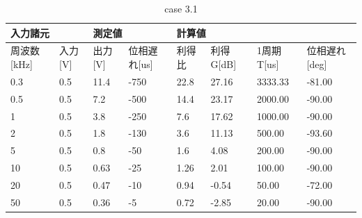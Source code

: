 \documentclass[dvipdfmx,titlepage,a4j]{jsarticle}  %
\begin{document}
\begin{table}[H]
  \centering
  \caption{case 3.1}
  \begin{tabular}{ll|ll|llll}
  \hline
  \multicolumn{2}{l|}{入力諸元}                        & \multicolumn{2}{l|}{測定値}                           & \multicolumn{4}{l}{計算値}                                                                                                                          \\ \hline
  \multicolumn{1}{l|}{周波数{[}kHz{]}} & 入力{[}V{]} & \multicolumn{1}{l|}{出力{[}V{]}} & 位相遅れ{[}us{]} & \multicolumn{1}{l|}{利得比} & \multicolumn{1}{l|}{利得G{[}dB{]}} & \multicolumn{1}{l|}{1周期T{[}us{]}} & \multicolumn{1}{l}{位相遅れ{[}deg{]}} \\ \hline \hline
  \multicolumn{1}{l|}{0.3}           & 0.5         & \multicolumn{1}{l|}{11.4}        & -750            & \multicolumn{1}{l|}{22.8}    & \multicolumn{1}{l|}{27.16}           & \multicolumn{1}{l|}{3333.33}         & -81.00                              \\ \hline
  \multicolumn{1}{l|}{0.5}           & 0.5         & \multicolumn{1}{l|}{7.2}         & -500            & \multicolumn{1}{l|}{14.4}    & \multicolumn{1}{l|}{23.17}           & \multicolumn{1}{l|}{2000.00}         & -90.00                              \\ \hline
  \multicolumn{1}{l|}{1}             & 0.5         & \multicolumn{1}{l|}{3.8}         & -250            & \multicolumn{1}{l|}{7.6}     & \multicolumn{1}{l|}{17.62}           & \multicolumn{1}{l|}{1000.00}         & -90.00                              \\ \hline
  \multicolumn{1}{l|}{2}             & 0.5         & \multicolumn{1}{l|}{1.8}         & -130            & \multicolumn{1}{l|}{3.6}     & \multicolumn{1}{l|}{11.13}           & \multicolumn{1}{l|}{500.00}          & -93.60                              \\ \hline
  \multicolumn{1}{l|}{5}             & 0.5         & \multicolumn{1}{l|}{0.8}         & -50             & \multicolumn{1}{l|}{1.6}     & \multicolumn{1}{l|}{4.08}            & \multicolumn{1}{l|}{200.00}          & -90.00                              \\ \hline
  \multicolumn{1}{l|}{10}            & 0.5         & \multicolumn{1}{l|}{0.63}        & -25             & \multicolumn{1}{l|}{1.26}    & \multicolumn{1}{l|}{2.01}            & \multicolumn{1}{l|}{100.00}          & -90.00                              \\ \hline
  \multicolumn{1}{l|}{20}            & 0.5         & \multicolumn{1}{l|}{0.47}        & -10             & \multicolumn{1}{l|}{0.94}    & \multicolumn{1}{l|}{-0.54}           & \multicolumn{1}{l|}{50.00}           & -72.00                              \\ \hline
  \multicolumn{1}{l|}{50}            & 0.5         & \multicolumn{1}{l|}{0.36}        & -5              & \multicolumn{1}{l|}{0.72}    & \multicolumn{1}{l|}{-2.85}           & \multicolumn{1}{l|}{20.00}           & -90.00   
  \end{tabular}
\end{table}
\end{document}

